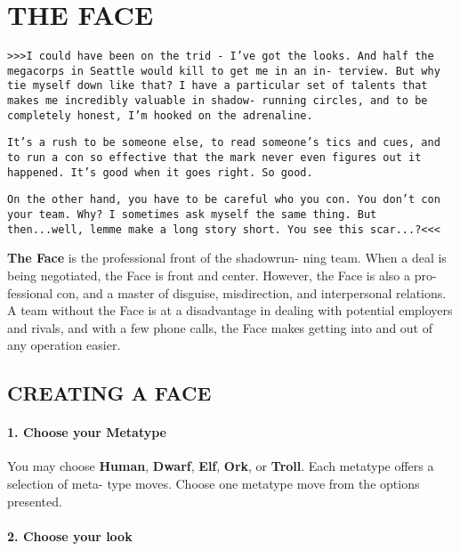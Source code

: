 
\section{THE FACE}
\begin{multicols}{3}
\setlength{\parskip}{.05cm}

\texttt{>>>I could have been on the trid - I’ve got the looks. And
half the megacorps in Seattle would kill to get me in an in-
terview. But why tie myself down like that? I have a particular
set of talents that makes me incredibly valuable in shadow-
running circles, and to be completely honest, I’m hooked on
the adrenaline.}

\texttt{It’s a rush to be someone else, to read someone’s tics and
cues, and to run a con so effective that the mark never even
figures out it happened. It’s good when it goes right. So
good.}

\texttt{On the other hand, you have to be careful who you con. You
don’t con your team. Why? I sometimes ask myself the same
thing. But then...well, lemme make a long story short. You see
this scar...?<<<}

\textbf{The Face} is the professional front of the shadowrun-
ning team. When a deal is being negotiated, the Face
is front and center. However, the Face is also a pro-
fessional con, and a master of disguise, misdirection,
and interpersonal relations. A team without the Face is
at a disadvantage in dealing with potential employers
and rivals, and with a few phone calls, the Face makes
getting into and out of any operation easier.



\subsection{CREATING A FACE}

\paragraph{1.  Choose your Metatype}

You may choose \textbf{Human}, \textbf{Dwarf}, \textbf{Elf}, \textbf{Ork}, or
\textbf{Troll}. Each metatype offers a selection of meta-
type moves. Choose one metatype move from
the options presented.

\paragraph{2.  Choose your look}


\end{multicols}
